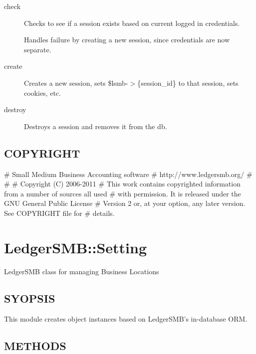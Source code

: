 \begin{description}
\begin{description}
\begin{description}
\begin{description}
\begin{description}
\begin{description}
\begin{description}
\item[{check}] \mbox{}

Checks to see if a session exists based on current logged in credentials.



Handles failure by creating a new session, since credentials are now separate.


\item[{create}] \mbox{}

Creates a new session, sets \$lsmb-$>$\{session\_id\} to that session, sets cookies, 
etc.


\item[{destroy}] \mbox{}

Destroys a session and removes it from the db.

\end{description}
\subsection*{COPYRIGHT\label{LedgerSMB::Session_COPYRIGHT}}


\# Small Medium Business Accounting software
\# http://www.ledgersmb.org/
\# 
\#
\# Copyright (C) 2006-2011
\# This work contains copyrighted information from a number of sources all used
\# with permission.  It is released under the GNU General Public License
\# Version 2 or, at your option, any later version.  See COPYRIGHT file for
\# details.

\section{LedgerSMB::Setting\label{LedgerSMB::Setting}}


LedgerSMB class for managing Business Locations

\subsection*{SYOPSIS\label{LedgerSMB::Setting_SYOPSIS}}


This module creates object instances based on LedgerSMB's in-database ORM.

\subsection*{METHODS\label{LedgerSMB::Setting_METHODS}}



\end{description}
\end{description}
\end{description}
\end{description}
\end{description}
\end{description}
